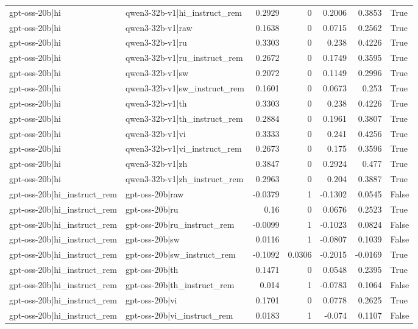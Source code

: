 \begin{table}
\begin{tabular}{l l r r r r l}
gpt-oss-20b|hi & qwen3-32b-v1|hi_instruct_rem & 0.2929 & 0 & 0.2006 & 0.3853 & True \\
gpt-oss-20b|hi & qwen3-32b-v1|raw & 0.1638 & 0 & 0.0715 & 0.2562 & True \\
gpt-oss-20b|hi & qwen3-32b-v1|ru & 0.3303 & 0 & 0.238 & 0.4226 & True \\
gpt-oss-20b|hi & qwen3-32b-v1|ru_instruct_rem & 0.2672 & 0 & 0.1749 & 0.3595 & True \\
gpt-oss-20b|hi & qwen3-32b-v1|sw & 0.2072 & 0 & 0.1149 & 0.2996 & True \\
gpt-oss-20b|hi & qwen3-32b-v1|sw_instruct_rem & 0.1601 & 0 & 0.0673 & 0.253 & True \\
gpt-oss-20b|hi & qwen3-32b-v1|th & 0.3303 & 0 & 0.238 & 0.4226 & True \\
gpt-oss-20b|hi & qwen3-32b-v1|th_instruct_rem & 0.2884 & 0 & 0.1961 & 0.3807 & True \\
gpt-oss-20b|hi & qwen3-32b-v1|vi & 0.3333 & 0 & 0.241 & 0.4256 & True \\
gpt-oss-20b|hi & qwen3-32b-v1|vi_instruct_rem & 0.2673 & 0 & 0.175 & 0.3596 & True \\
gpt-oss-20b|hi & qwen3-32b-v1|zh & 0.3847 & 0 & 0.2924 & 0.477 & True \\
gpt-oss-20b|hi & qwen3-32b-v1|zh_instruct_rem & 0.2963 & 0 & 0.204 & 0.3887 & True \\
gpt-oss-20b|hi_instruct_rem & gpt-oss-20b|raw & -0.0379 & 1 & -0.1302 & 0.0545 & False \\
gpt-oss-20b|hi_instruct_rem & gpt-oss-20b|ru & 0.16 & 0 & 0.0676 & 0.2523 & True \\
gpt-oss-20b|hi_instruct_rem & gpt-oss-20b|ru_instruct_rem & -0.0099 & 1 & -0.1023 & 0.0824 & False \\
gpt-oss-20b|hi_instruct_rem & gpt-oss-20b|sw & 0.0116 & 1 & -0.0807 & 0.1039 & False \\
gpt-oss-20b|hi_instruct_rem & gpt-oss-20b|sw_instruct_rem & -0.1092 & 0.0306 & -0.2015 & -0.0169 & True \\
gpt-oss-20b|hi_instruct_rem & gpt-oss-20b|th & 0.1471 & 0 & 0.0548 & 0.2395 & True \\
gpt-oss-20b|hi_instruct_rem & gpt-oss-20b|th_instruct_rem & 0.014 & 1 & -0.0783 & 0.1064 & False \\
gpt-oss-20b|hi_instruct_rem & gpt-oss-20b|vi & 0.1701 & 0 & 0.0778 & 0.2625 & True \\
gpt-oss-20b|hi_instruct_rem & gpt-oss-20b|vi_instruct_rem & 0.0183 & 1 & -0.074 & 0.1107 & False \\

\end{tabular}
\end{table}
